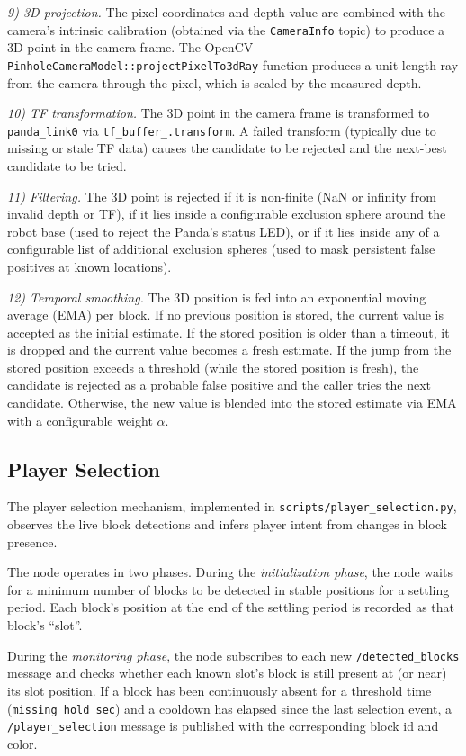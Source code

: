\documentclass[conference]{IEEEtran}
\begin{document}
\textit{9) 3D projection.} The pixel coordinates and depth value are
combined with the camera's intrinsic calibration (obtained via the
\texttt{CameraInfo} topic) to produce a 3D point in the camera frame.
The OpenCV \texttt{PinholeCameraModel::projectPixelTo3dRay} function
produces a unit-length ray from the camera through the pixel, which
is scaled by the measured depth.

\textit{10) TF transformation.} The 3D point in the camera frame is
transformed to \texttt{panda\_link0} via \texttt{tf\_buffer\_.transform}.
A failed transform (typically due to missing or stale TF data) causes
the candidate to be rejected and the next-best candidate to be tried.

\textit{11) Filtering.} The 3D point is rejected if it is non-finite
(NaN or infinity from invalid depth or TF), if it lies inside a
configurable exclusion sphere around the robot base (used to reject
the Panda's status LED), or if it lies inside any of a configurable
list of additional exclusion spheres (used to mask persistent false
positives at known locations).

\textit{12) Temporal smoothing.} The 3D position is fed into an
exponential moving average (EMA) per block. If no previous position
is stored, the current value is accepted as the initial estimate. If
the stored position is older than a timeout, it is dropped and the
current value becomes a fresh estimate. If the jump from the stored
position exceeds a threshold (while the stored position is fresh), the
candidate is rejected as a probable false positive and the caller
tries the next candidate. Otherwise, the new value is blended into the
stored estimate via EMA with a configurable weight $\alpha$.

\subsection{Player Selection}
\label{sec:selection}

The player selection mechanism, implemented in
\texttt{scripts/player\_selection.py}, observes the live block
detections and infers player intent from changes in block presence.

The node operates in two phases. During the \textit{initialization
phase}, the node waits for a minimum number of blocks to be detected
in stable positions for a settling period. Each block's position at
the end of the settling period is recorded as that block's ``slot''.

During the \textit{monitoring phase}, the node subscribes to each new
\texttt{/detected\_blocks} message and checks whether each known
slot's block is still present at (or near) its slot position. If a
block has been continuously absent for a threshold time
(\texttt{missing\_hold\_sec}) and a cooldown has elapsed since the
last selection event, a \texttt{/player\_selection} message is
published with the corresponding block id and color.
\end{document}
